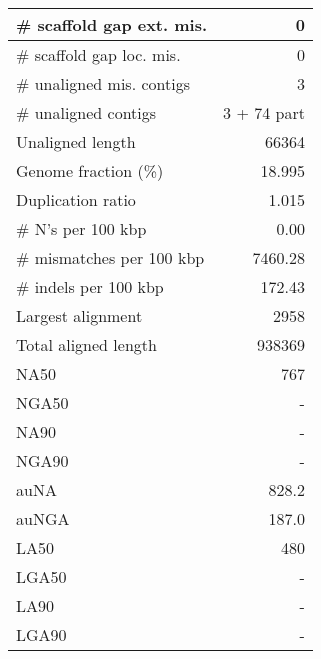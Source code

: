 \documentclass[12pt,a4paper]{article}
\begin{document}
\begin{table}[ht]
\begin{center}
\begin{tabular}{|l*{1}{|r}|}
\# scaffold gap ext. mis. & 0 \\ \hline
\# scaffold gap loc. mis. & 0 \\ \hline
\# unaligned mis. contigs & 3 \\ \hline
\# unaligned contigs & 3 + 74 part \\ \hline
Unaligned length & 66364 \\ \hline
Genome fraction (\%) & 18.995 \\ \hline
Duplication ratio & 1.015 \\ \hline
\# N's per 100 kbp & 0.00 \\ \hline
\# mismatches per 100 kbp & 7460.28 \\ \hline
\# indels per 100 kbp & 172.43 \\ \hline
Largest alignment & 2958 \\ \hline
Total aligned length & 938369 \\ \hline
NA50 & 767 \\ \hline
NGA50 & - \\ \hline
NA90 & - \\ \hline
NGA90 & - \\ \hline
auNA & 828.2 \\ \hline
auNGA & 187.0 \\ \hline
LA50 & 480 \\ \hline
LGA50 & - \\ \hline
LA90 & - \\ \hline
LGA90 & - \\ \hline
\end{tabular}
\end{center}
\end{table}
\end{document}
